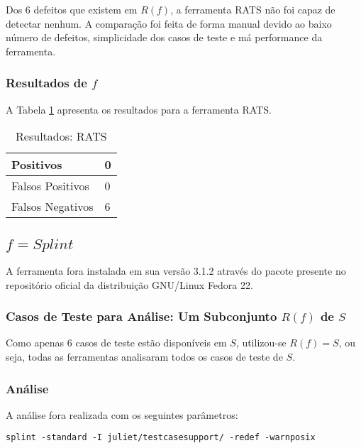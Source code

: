 Dos 6 defeitos que existem em $R(f)$, a ferramenta RATS não foi capaz de detectar nenhum. A comparação foi feita de forma manual devido ao baixo número de defeitos, simplicidade dos casos de teste e má performance da ferramenta.

\subsubsection{Resultados de $f$}

A Tabela \ref{tabela_rats} apresenta os resultados para a ferramenta RATS.
\begin{table}[h]
\caption{Resultados: RATS}
  \centering
\begin{tabular}{l | l}
  \hline
  Positivos\index{positivo} & 0 \\ \hline
  Falsos Positivos\index{falso positivo} & 0 \\ \hline
  Falsos Negativos\index{falso negativo} & 6 \\
  \hline
\end{tabular}
\label{tabela_rats}
\end{table}

\subsection{$f = Splint$}

A ferramenta fora instalada em sua versão 3.1.2 através do pacote presente no repositório oficial da distribuição GNU/Linux Fedora 22.

\subsubsection{Casos de Teste para Análise: Um Subconjunto $R(f)$ de $S$}

Como apenas 6 casos de teste estão disponíveis em $S$, utilizou-se $R(f) = S$, ou seja, todas as ferramentas analisaram todos os casos de teste de $S$.

\subsubsection{Análise}

A análise fora realizada com os seguintes parâmetros:

\lstinline{splint -standard -I juliet/testcasesupport/ -redef -warnposix}

